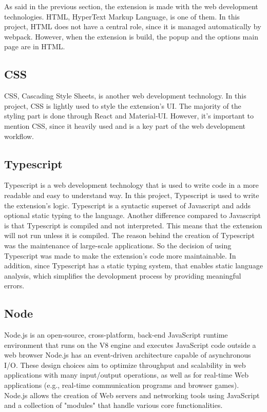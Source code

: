As said in the previous section, the extension is made with the web development technologies. HTML, HyperText Markup Language, is one of them.
In this project, HTML does not have a central role, since it is managed automatically by webpack. However, when the extension is build, the popup and the options main page are in HTML.

\subsection {CSS}

CSS, Cascading Style Sheets, is another web development technology. In this project, CSS is lightly used to style the extension's UI. The majority of the styling part is done through React and Material-UI. However, it's important to mention CSS, since it heavily used and is a key part of the web development workflow.

\subsection {Typescript}

Typescript is a web development technology that is used to write code in a more readable and easy to understand way. In this project, Typescript is used to write the extension's logic.
Typescript is a syntactic superset of Javascript and adds optional static typing to the language. Another difference compared to Javascript is that Typescript is compiled and not interpreted. This means that the extension will not run unless it is compiled. The reason behind the creation of Typescript was the maintenance of large-scale applications. So the decision of using Typescript was made to make the extension's code more maintainable.
In addition, since Typescript has a static typing system, that enables static language analysis, which simplifies the devolopment process by providing meaningful errors.
\subsection {Node}

Node.js is an open-source, cross-platform, back-end JavaScript runtime environment that runs on the V8 engine and executes JavaScript code outside a web browser
Node.js has an event-driven architecture capable of asynchronous I/O. These design choices aim to optimize throughput and scalability in web applications with many input/output operations, as well as for real-time Web applications (e.g., real-time communication programs and browser games).
Node.js allows the creation of Web servers and networking tools using JavaScript and a collection of "modules" that handle various core functionalities.

